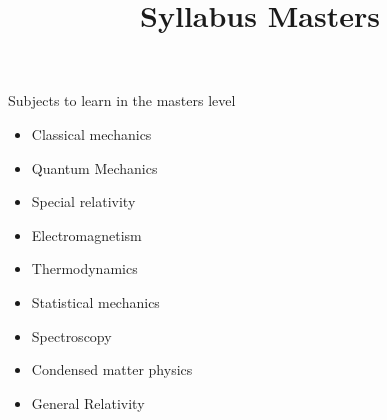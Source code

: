 \documentclass{../template/texnote}
\title{Syllabus Masters}
\begin{document}
    \maketitle {}
Subjects to learn in the masters level
\begin{itemize}
\item  Classical mechanics
\item  Quantum Mechanics
\item  Special relativity
\item  Electromagnetism
\item  Thermodynamics
\item  Statistical mechanics
\item  Spectroscopy
\item  Condensed matter physics
\item  General Relativity
\end{itemize}
    \printbibliography
\end{document}

